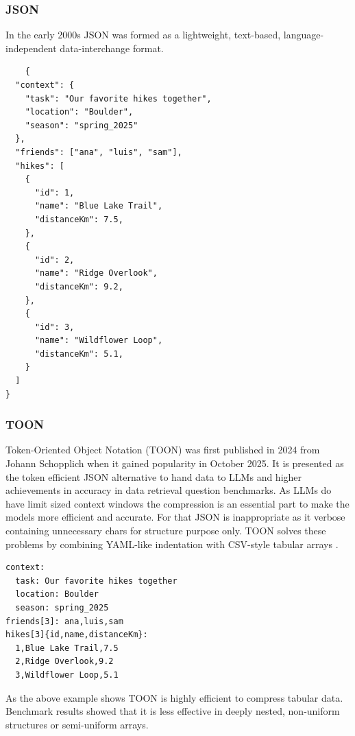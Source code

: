 \documentclass[10pt,twocolumn,letterpaper]{article}
\begin{document}
\subsubsection{JSON}
In the early 2000s JSON was formed as a lightweight, text-based, language-independent data-interchange format. 
\citep{Bourhis_Reutter_Suárez_Vrgoč_2017}

\begin{samepage}
\begin{verbatim}
    {
  "context": {
    "task": "Our favorite hikes together",
    "location": "Boulder",
    "season": "spring_2025"
  },
  "friends": ["ana", "luis", "sam"],
  "hikes": [
    {
      "id": 1,
      "name": "Blue Lake Trail",
      "distanceKm": 7.5,
    },
    {
      "id": 2,
      "name": "Ridge Overlook",
      "distanceKm": 9.2,
    },
    {
      "id": 3,
      "name": "Wildflower Loop",
      "distanceKm": 5.1,
    }
  ]
}
\end{verbatim}
\end{samepage}

\subsubsection{TOON}
Token-Oriented Object Notation (TOON) was first published in 2024 from Johann Schopplich when it gained popularity in October 2025. It is presented as the token efficient JSON alternative to hand data to LLMs and higher achievements in accuracy in data retrieval question benchmarks. As LLMs do have limit sized context windows the compression is an essential part to make the models more efficient and accurate. For that JSON is inappropriate as it verbose containing unnecessary chars for structure purpose only. TOON solves these problems by combining YAML-like indentation with CSV-style tabular arrays \citep{toon-format/toon_2026}.

\begin{samepage}
\begin{verbatim}
context:
  task: Our favorite hikes together
  location: Boulder
  season: spring_2025
friends[3]: ana,luis,sam
hikes[3]{id,name,distanceKm}:
  1,Blue Lake Trail,7.5
  2,Ridge Overlook,9.2
  3,Wildflower Loop,5.1
\end{verbatim}
\end{samepage}


As the above example shows TOON is highly efficient to compress tabular data. Benchmark results \citep{toon-format/toon_2026, Lafalce_2025} showed that it is less effective in deeply nested, non-uniform structures or semi-uniform arrays.
\end{document}
